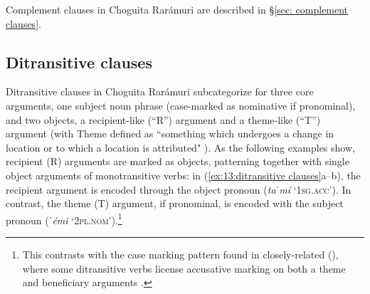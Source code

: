     \z
\z

Complement clauses in Choguita Rarámuri are described in §\ref{sec: complement clauses}.

\subsection{Ditransitive clauses}
\label{subsec: ditransitive clauses}



Ditransitive clauses in Choguita Rarámuri subcategorize for three core arguments, one subject noun phrase (case-marked as nominative if pronominal), and two objects, a recipient-like (``R'') argument and a theme-like (``T'') argument (with Theme defined as ``something which undergoes a change in location or to which a location is attributed" \parencite{dryer2007clause}). As the following examples show, recipient (R) arguments are marked as objects, patterning together with single object arguments of monotransitive verbs: in (\ref{ex:13:ditransitive clauses}a--b), the recipient argument is encoded through the object pronoun (\textit{taˈmí} `\textsc{1sg.acc}'). In contrast, the theme (T) argument, if pronominal, is encoded with the subject pronoun (\textit{ˈémi} `\textsc{2pl.nom}').\footnote{This contrasts with the case marking pattern found in closely-related  (), where some ditransitive verbs license accusative marking on both a theme and beneficiary arguments \citep{guerrero2004yaqui}.}

